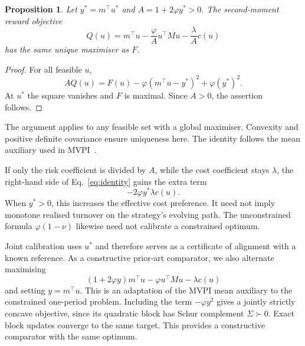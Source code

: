 \documentclass[sigconf,anonymous,review]{acmart}
\newtheorem{proposition}{Proposition}
\begin{document}
\begin{proposition}\label{prop:joint}
Let $y^*=m^\top u^*$ and $A=1+2\varphi y^*>0$. The second-moment reward objective
\begin{equation}
 Q(u)=m^\top u-\frac{\varphi}{A}u^\top M u-\frac{\lambda}{A}c(u)
\end{equation}
has the same unique maximiser as $F$.
\end{proposition}
\begin{proof}
For all feasible $u$,
\begin{equation}\label{eq:identity}
 AQ(u)=F(u)-\varphi(m^\top u-y^*)^2+\varphi(y^*)^2.
\end{equation}
At $u^*$ the square vanishes and $F$ is maximal. Since $A>0$, the assertion follows.
\end{proof}
The argument applies to any feasible set with a global maximiser. Convexity and positive definite covariance ensure uniqueness here. The identity follows the mean auxiliary used in MVPI\ \cite{zhang2021}.

If only the risk coefficient is divided by $A$, while the cost coefficient stays $\lambda$, the right-hand side of Eq.\ \eqref{eq:identity} gains the extra term
\begin{equation}\label{eq:costdistortion}
 -2\varphi y^*\lambda c(u).
\end{equation}
When $y^*>0$, this increases the effective cost preference. It need not imply monotone realised turnover on the strategy's evolving path. The unconstrained formula $\varphi(1-\nu)$ likewise need not calibrate a constrained optimum.

Joint calibration uses $u^*$ and therefore serves as a certificate of alignment with a known reference. As a constructive prior-art comparator, we also alternate maximising
\begin{equation}
 (1+2\varphi y)m^\top u-\varphi u^\top Mu-\lambda c(u)
\end{equation}
and setting $y=m^\top u$. This is an adaptation of the MVPI mean auxiliary to the constrained one-period problem. Including the term $-\varphi y^2$ gives a jointly strictly concave objective, since its quadratic block has Schur complement $\Sigma\succ0$. Exact block updates converge to the same target. This provides a constructive comparator with the same optimum.
\end{document}
